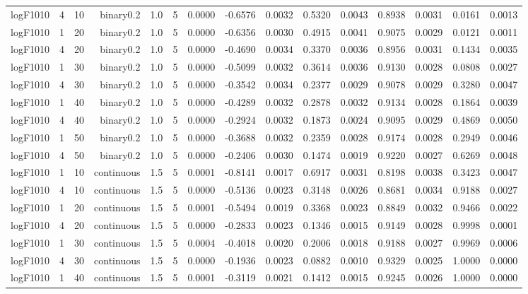 \begin{longtable}{rrrrrrrrrrrrrrr}
  logF1010 & 4 & 10 & binary0.2 & 1.0 & 5 & 0.0000 & -0.6576 & 0.0032 & 0.5320 & 0.0043 & 0.8938 & 0.0031 & 0.0161 & 0.0013 \\ 
  logF1010 & 1 & 20 & binary0.2 & 1.0 & 5 & 0.0000 & -0.6356 & 0.0030 & 0.4915 & 0.0041 & 0.9075 & 0.0029 & 0.0121 & 0.0011 \\ 
  logF1010 & 4 & 20 & binary0.2 & 1.0 & 5 & 0.0000 & -0.4690 & 0.0034 & 0.3370 & 0.0036 & 0.8956 & 0.0031 & 0.1434 & 0.0035 \\ 
  logF1010 & 1 & 30 & binary0.2 & 1.0 & 5 & 0.0000 & -0.5099 & 0.0032 & 0.3614 & 0.0036 & 0.9130 & 0.0028 & 0.0808 & 0.0027 \\ 
  logF1010 & 4 & 30 & binary0.2 & 1.0 & 5 & 0.0000 & -0.3542 & 0.0034 & 0.2377 & 0.0029 & 0.9078 & 0.0029 & 0.3280 & 0.0047 \\ 
  logF1010 & 1 & 40 & binary0.2 & 1.0 & 5 & 0.0000 & -0.4289 & 0.0032 & 0.2878 & 0.0032 & 0.9134 & 0.0028 & 0.1864 & 0.0039 \\ 
  logF1010 & 4 & 40 & binary0.2 & 1.0 & 5 & 0.0000 & -0.2924 & 0.0032 & 0.1873 & 0.0024 & 0.9095 & 0.0029 & 0.4869 & 0.0050 \\ 
  logF1010 & 1 & 50 & binary0.2 & 1.0 & 5 & 0.0000 & -0.3688 & 0.0032 & 0.2359 & 0.0028 & 0.9174 & 0.0028 & 0.2949 & 0.0046 \\ 
  logF1010 & 4 & 50 & binary0.2 & 1.0 & 5 & 0.0000 & -0.2406 & 0.0030 & 0.1474 & 0.0019 & 0.9220 & 0.0027 & 0.6269 & 0.0048 \\ 
  logF1010 & 1 & 10 & continuous & 1.5 & 5 & 0.0001 & -0.8141 & 0.0017 & 0.6917 & 0.0031 & 0.8198 & 0.0038 & 0.3423 & 0.0047 \\ 
  logF1010 & 4 & 10 & continuous & 1.5 & 5 & 0.0000 & -0.5136 & 0.0023 & 0.3148 & 0.0026 & 0.8681 & 0.0034 & 0.9188 & 0.0027 \\ 
  logF1010 & 1 & 20 & continuous & 1.5 & 5 & 0.0001 & -0.5494 & 0.0019 & 0.3368 & 0.0023 & 0.8849 & 0.0032 & 0.9466 & 0.0022 \\ 
  logF1010 & 4 & 20 & continuous & 1.5 & 5 & 0.0000 & -0.2833 & 0.0023 & 0.1346 & 0.0015 & 0.9149 & 0.0028 & 0.9998 & 0.0001 \\ 
  logF1010 & 1 & 30 & continuous & 1.5 & 5 & 0.0004 & -0.4018 & 0.0020 & 0.2006 & 0.0018 & 0.9188 & 0.0027 & 0.9969 & 0.0006 \\ 
  logF1010 & 4 & 30 & continuous & 1.5 & 5 & 0.0000 & -0.1936 & 0.0023 & 0.0882 & 0.0010 & 0.9329 & 0.0025 & 1.0000 & 0.0000 \\ 
  logF1010 & 1 & 40 & continuous & 1.5 & 5 & 0.0001 & -0.3119 & 0.0021 & 0.1412 & 0.0015 & 0.9245 & 0.0026 & 1.0000 & 0.0000 \\ 

\end{longtable}
